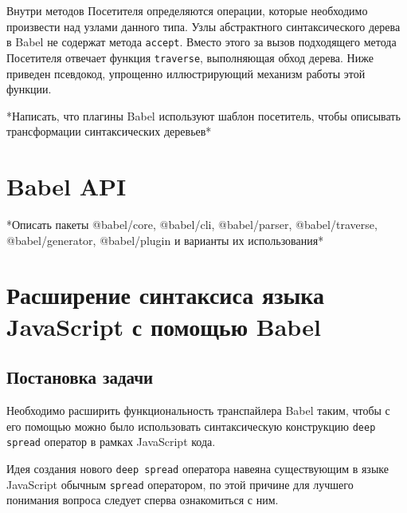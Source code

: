 \documentclass[14pt, a4paper]{article}
\def\code#1{\texttt{#1}} %
\begin{document}
Внутри методов Посетителя определяются операции, которые необходимо произвести над узлами данного типа.
Узлы абстрактного синтаксического дерева в Babel не содержат метода \code{accept}. Вместо этого за вызов
подходящего метода Посетителя отвечает функция \code{traverse}, выполняющая обход дерева. Ниже приведен 
псевдокод, упрощенно иллюстрирующий механизм работы этой функции.



 *Написать, что плагины Babel используют шаблон посетитель, чтобы описывать трансформации синтаксических деревьев*

\pagebreak

\section{Babel API}

*Описать пакеты @babel/core, @babel/cli, @babel/parser, @babel/traverse, @babel/generator, @babel/plugin и варианты их использования* 
 

\pagebreak

\section{Расширение синтаксиса языка JavaScript с помощью Babel}
\subsection{Постановка задачи}
Необходимо расширить функциональность транспайлера Babel таким, чтобы с его помощью можно было использовать 
синтаксическую конструкцию \code{deep spread} оператор в рамках JavaScript кода. 

Идея создания нового \code{deep spread} оператора навеяна существующим в языке JavaScript обычным \code{spread}
оператором, по этой причине для лучшего понимания вопроса следует сперва ознакомиться с ним.
\end{document}
